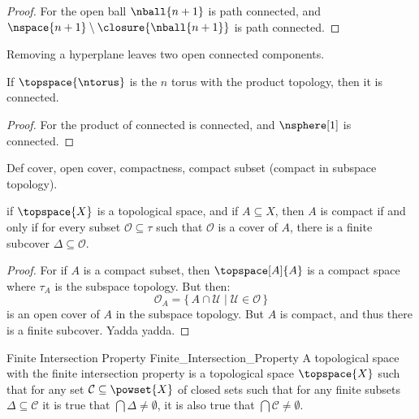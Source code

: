 \documentclass{book}                                                           %
\begin{document}
            \begin{proof}
                For the open ball $\nball{n+1}$ is path connected, and
                $\nspace{n+1}\setminus\closure{\nball{n+1}}$ is path connected.
            \end{proof}
            Removing a hyperplane leaves two open connected components.
            \begin{theorem}
                If $\topspace{\ntorus}$ is the $n$ torus with the product topology,
                then it is connected.
            \end{theorem}
            \begin{proof}
                For the product of connected is connected, and $\nsphere[1]$ is
                connected.
            \end{proof}
            Def cover, open cover, compactness, compact subset
            (compact in subspace topology).
            \begin{theorem}
                if $\topspace{X}$ is a topological space, and if $A\subseteq{X}$,
                then $A$ is compact if and only if for every subset
                $\mathcal{O}\subseteq\tau$ such that $\mathcal{O}$ is a cover of
                $A$, there is a finite subcover $\Delta\subseteq\mathcal{O}$.
            \end{theorem}
            \begin{proof}
                For if $A$ is a compact subset, then $\topspace[A]{A}$ is a compact
                space where $\tau_{A}$ is the subspace topology. But then:
                \begin{equation}
                    \mathcal{O}_{A}=\{\,A\cap\mathcal{U}\;|\;
                        \mathcal{U}\in\mathcal{O}\,\}
                \end{equation}
                is an open cover of $A$ in the subspace topology. But $A$ is
                compact, and thus there is a finite subcover. Yadda yadda.
            \end{proof}
            \begin{fdefinition}{Finite Intersection Property}
                               {Finite_Intersection_Property}
                A topological space with the finite intersection property is a
                topological space $\topspace{X}$ such that for any set
                $\mathcal{C}\subseteq\powset{X}$ of closed sets such that for any
                finite subsets $\Delta\subseteq\mathcal{C}$ it is true that
                $\bigcap\Delta\ne\emptyset$, it is also true that
                $\bigcap\mathcal{C}\ne\emptyset$.
            \end{fdefinition}
\end{document}
